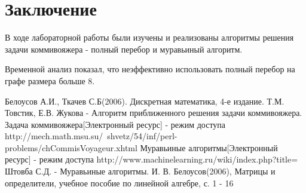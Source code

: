 \documentclass[12pt]{report}
\begin{document}
\chapter*{Заключение}
В ходе лабораторной работы были изучены и реализованы алгоритмы решения задачи коммивояжера - полный перебор и муравьиный алгоритм.

Временной анализ показал, что неэффективно использовать полный перебор на графе размера больше 8.

\begin{thebibliography}{3}
	 Белоусов А.И., Ткачев С.Б(2006). Дискретная математика, 4-е издание.
	 Т.М. Товстик, Е.В. Жукова - Алгоритм приближенного решения задачи коммивояжера.
	 Задача коммивояжера[Электронный ресурс] - режим доступа http://mech.math.msu.su/~shvetz/54/inf/perl-problems/chCommisVoyageur.xhtml
	 Муравьиные алгоритмы[Электронный ресурс] - режим доступа http://www.machinelearning.ru/wiki/index.php?title=%
	 Штовба С.Д. - Муравьиные алгоритмы.
	 И. В. Белоусов(2006), Матрицы и определители, учебное пособие по линейной алгебре, с. 1 - 16
\end{thebibliography}
\end{document}
